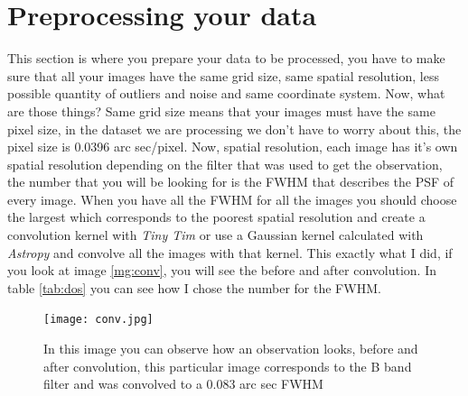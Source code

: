 \documentclass[11pt,fleqn]{book} %
\begin{document}
\section{Preprocessing your data}
This section is where you prepare your data to be processed, you have to make sure that all your images have the same grid size, same spatial resolution, less possible quantity of outliers and noise and same coordinate system. Now, what are those things? Same grid size means that your images must have the same pixel size, in the dataset we are processing we don't have to worry about this, the pixel size is 0.0396 arc sec/pixel. Now, spatial resolution, each image has it's own spatial resolution depending on the filter that was used to get the observation, the number that you will be looking for is the FWHM that describes the PSF of every image. When you have all the FWHM for all the images you should choose the largest which corresponds to the poorest spatial resolution and create a convolution kernel with \emph{Tiny Tim} or use a Gaussian kernel calculated with \emph{Astropy} and convolve all the images with that kernel. This exactly what I did, if you look at image \ref{mg:conv}, you will see the before and after convolution. In table \ref{tab:dos} you can see how I chose the number for the FWHM.

\begin{figure}[h]
	\centering
    \texttt{[image: conv.jpg]}
    \caption{In this image you can observe how an observation looks, before and after convolution, this particular image corresponds to the B band filter and was convolved to a 0.083 arc sec FWHM}
    \label{img:conv}
\end{figure}
\end{document}
